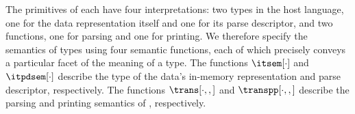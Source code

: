 The primitives of \ddc{} each have four interpretations: two
types in the host language, one for the data representation
itself and one for its parse descriptor, and two functions,
one for parsing and one for printing.
We therefore specify the semantics of \ddc{} types using four semantic
functions, each of which precisely conveys a particular facet of the
meaning of a type.  The functions $\itsem[\cdot]$ and $\itpdsem[\cdot]$
describe the type of the data's in-memory representation and 
parse descriptor, respectively. The
functions $\trans[\cdot,,]$ and $\transpp[\cdot,,]$ describe 
the parsing and printing semantics of \ddc{}, respectively.


